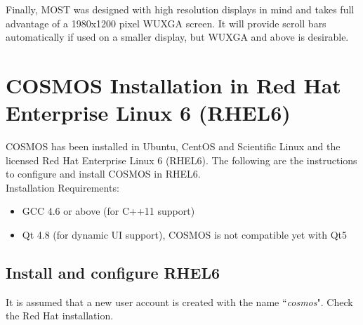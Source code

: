\documentclass{article}
\begin{document}
Finally, MOST was designed with high resolution displays in mind and takes full advantage of a 1980x1200 pixel WUXGA screen. It will provide scroll bars automatically if used on a smaller display, but WUXGA and above is desirable.









\section{COSMOS Installation in Red Hat Enterprise Linux 6 (RHEL6)} 
COSMOS has been installed in Ubuntu, CentOS and Scientific Linux and the licensed Red Hat Enterprise Linux 6 (RHEL6). The following are the instructions to configure and install COSMOS in RHEL6. \\


Installation Requirements:
\begin{itemize}
\item  GCC 4.6 or above (for C++11 support)
\item Qt 4.8 (for dynamic UI support), COSMOS is not compatible yet with Qt5 
\end{itemize}

\subsection{Install and configure RHEL6}
It is assumed that a new user account is created with the name ``\textit{cosmos}". Check the Red Hat installation.
\end{document}
